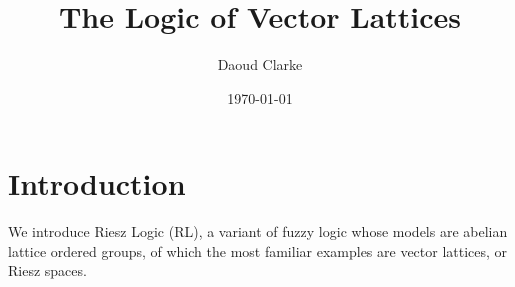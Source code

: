 \documentclass[preprint,leqno]{elsarticle}
\author{Daoud Clarke}
\date{\today}
\title{The Logic of Vector Lattices}
\begin{document}
\maketitle


\section{Introduction}

We introduce Riesz Logic (RL), a variant of fuzzy logic whose models
are abelian lattice ordered groups, of which the most familiar
examples are vector lattices, or Riesz spaces.
%






\end{document}
